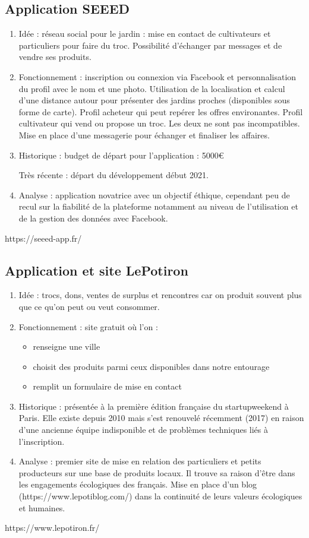 \documentclass{article}
\begin{document}
\subsection{Application SEEED}
\begin{enumerate}
    \item Idée : réseau social pour le jardin : mise en contact de
    cultivateurs et particuliers pour faire du troc. Possibilité 
    d'échanger par messages et de vendre ses produits.
    \item Fonctionnement : inscription ou connexion via Facebook et
    personnalisation du profil avec le nom et une photo.
    Utilisation de la localisation et calcul d'une distance autour
    pour présenter des jardins proches (disponibles sous forme de carte).
    Profil acheteur qui peut repérer les offres environantes.
    Profil cultivateur qui vend ou propose un troc.
    Les deux ne sont pas incompatibles.
    Mise en place d'une messagerie pour échanger et finaliser les affaires.
    \item Historique : budget de départ pour l'application : 5000€
    
    Très récente : départ du développement début 2021.
    \item Analyse : application novatrice avec un objectif éthique,
    cependant peu de recul sur la fiabilité de la plateforme notamment
    au niveau de l'utilisation et de la gestion des données avec Facebook.
\end{enumerate}
https://seeed-app.fr/ 

\subsection{Application et site LePotiron} 
\begin{enumerate}
    \item Idée : trocs, dons, ventes de surplus et rencontres car on produit
    souvent plus que ce qu'on peut ou veut consommer.
    \item Fonctionnement : site gratuit où l'on :
    \begin{itemize}
        \item renseigne une ville
        \item choisit des produits parmi ceux disponibles dans notre entourage
        \item remplit un formulaire de mise en contact
    \end{itemize}
        \item Historique : présentée à la première édition française du startupweekend à Paris. Elle existe depuis 2010 mais s'est 
    renouvelé récemment (2017) en raison d'une ancienne équipe indisponible et de problèmes
    techniques liés à l'inscription.
    \item Analyse : premier site de mise en relation des particuliers et petits producteurs sur une base de produits locaux. Il trouve sa raison d'être dans les engagements écologiques des français.
    Mise en place d'un blog (https://www.lepotiblog.com/) dans la continuité
    de leurs valeurs écologiques et humaines.
\end{enumerate}
https://www.lepotiron.fr/
\end{document}
